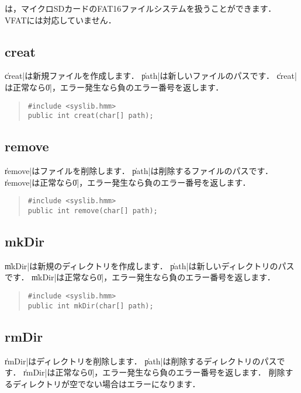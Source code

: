 \tacos は，マイクロSDカードのFAT16ファイルシステムを扱うことができます．
VFATには対応していません．

\subsection{creat}

\|creat|は新規ファイルを作成します．
\|path|は新しいファイルのパスです．
\|creat|は正常なら\|0|，エラー発生なら負のエラー番号を返します．

\begin{quote}
\begin{verbatim}
#include <syslib.hmm>
public int creat(char[] path);
\end{verbatim}
\end{quote}

\subsection{remove}

\|remove|はファイルを削除します．
\|path|は削除するファイルのパスです．
\|remove|は正常なら\|0|，エラー発生なら負のエラー番号を返します．

\begin{quote}
\begin{verbatim}
#include <syslib.hmm>
public int remove(char[] path);
\end{verbatim}
\end{quote}

\subsection{mkDir}

\|mkDir|は新規のディレクトリを作成します．
\|path|は新しいディレクトリのパスです．
\|mkDir|は正常なら\|0|，エラー発生なら負のエラー番号を返します．

\begin{quote}
\begin{verbatim}
#include <syslib.hmm>
public int mkDir(char[] path);
\end{verbatim}
\end{quote}

\subsection{rmDir}

\|rmDir|はディレクトリを削除します．
\|path|は削除するディレクトリのパスです．
\|rmDir|は正常なら\|0|，エラー発生なら負のエラー番号を返します．
削除するディレクトリが空でない場合はエラーになります．

